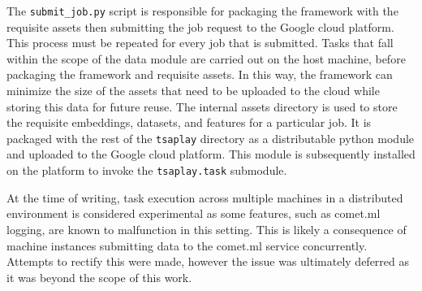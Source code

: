 \documentclass[../../fyp.tex]{subfiles}
\begin{document}
The \texttt{submit\_job.py} script is responsible for packaging the framework with the requisite assets then submitting the job request to the Google cloud platform. This process must be repeated for every job that is submitted. Tasks that fall within the scope of the data module are carried out on the host machine, before packaging the framework and requisite assets. In this way, the framework can minimize the size of the assets that need to be uploaded to the cloud while storing this data for future reuse. The internal assets directory is used to store the requisite embeddings, datasets, and features for a particular job. It is packaged with the rest of the \texttt{tsaplay} directory as a distributable python module and uploaded to the Google cloud platform. This module is subsequently installed on the platform to invoke the \texttt{tsaplay.task} submodule.

At the time of writing, task execution across multiple machines in a distributed environment is considered experimental as some features, such as comet.ml logging, are known to malfunction in this setting. This is likely a consequence of machine instances submitting data to the comet.ml service concurrently. Attempts to rectify this were made, however the issue was ultimately deferred as it was beyond the scope of this work.
\end{document}
